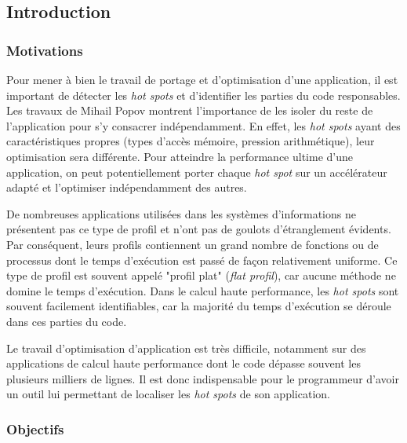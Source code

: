 \subsection{Introduction}


    \subsubsection{Motivations}

        
        Pour mener à bien le travail de portage et d'optimisation d’une application, il est important de détecter les \textit{hot spots} et d'identifier les parties du code responsables. Les travaux de Mihail Popov \cite{popov:tel-01412638}  montrent l’importance de les isoler du reste de l’application pour s’y consacrer indépendamment. En effet, les \textit{hot spots} ayant des caractéristiques propres (types d'accès mémoire, pression arithmétique), leur optimisation sera différente. Pour atteindre la performance ultime d’une application, on peut potentiellement porter chaque \textit{hot spot} sur un accélérateur adapté et l’optimiser indépendamment des autres.
        
        De nombreuses applications utilisées dans les systèmes d'informations ne présentent pas ce type de profil et  n'ont pas de goulots d'étranglement évidents. Par conséquent, leurs profils contiennent un grand nombre de fonctions ou de processus dont le temps d'exécution est passé de façon relativement uniforme\cite{Amaral2015}. Ce type de profil est souvent appelé "profil plat" (\textit{flat profil}), car aucune méthode ne domine le temps d'exécution. Dans le calcul haute performance, les \textit{hot spots} sont souvent facilement identifiables, car la majorité du temps d'exécution se déroule dans ces parties du code. 
        
        Le travail d'optimisation d'application est très difficile, notamment sur des applications de calcul haute performance dont le code dépasse souvent les plusieurs milliers de lignes. Il est donc indispensable pour le programmeur d'avoir un outil lui permettant de localiser les \textit{hot spots} de son application.
        

    
    \subsubsection{Objectifs}

